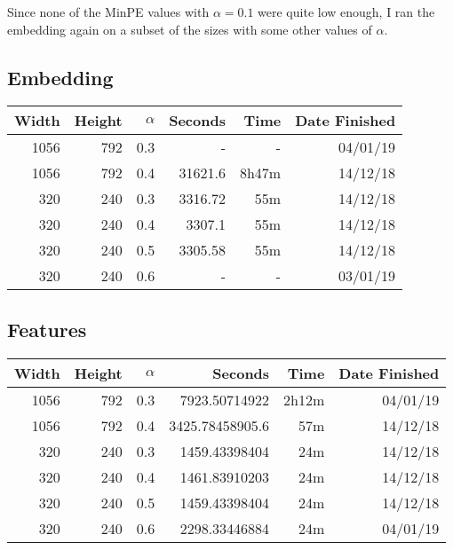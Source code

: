 Since none of the MinPE values with $\alpha = 0.1$ were quite low enough, I ran the embedding again on a subset of the sizes with some other values of $\alpha$.

\subsection{Embedding}
  \begin{center}
  \begin{tabular}{ r r | r | r r r }
  Width & Height & $\alpha$ & Seconds & Time & Date Finished \\ \hline
  1056 & 792 & 0.3 & - & - & 04/01/19 \\
  1056 & 792 & 0.4 & 31621.6 & 8h47m & 14/12/18 \\
  320 & 240 & 0.3 & 3316.72 & 55m & 14/12/18 \\
  320 & 240 & 0.4 & 3307.1 & 55m & 14/12/18 \\
  320 & 240 & 0.5 & 3305.58 & 55m & 14/12/18 \\
  320 & 240 & 0.6 & - & - & 03/01/19 \\
  \end{tabular}
  \end{center}

\subsection{Features}
  \begin{center}
  \begin{tabular}{ r r | r | r r r }
  Width & Height & $\alpha$ & Seconds & Time & Date Finished \\ \hline
  1056 & 792 & 0.3 & 7923.50714922 & 2h12m & 04/01/19 \\
  1056 & 792 & 0.4 & 3425.78458905.6 & 57m & 14/12/18 \\
  320 & 240 & 0.3 & 1459.43398404 & 24m & 14/12/18 \\
  320 & 240 & 0.4 & 1461.83910203 & 24m & 14/12/18 \\
  320 & 240 & 0.5 & 1459.43398404 & 24m & 14/12/18 \\
  320 & 240 & 0.6 & 2298.33446884 & 24m & 04/01/19 \\
  \end{tabular}
  \end{center}


